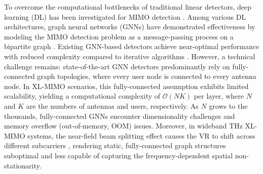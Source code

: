 To overcome the computational bottlenecks of traditional linear detectors, deep learning (DL) has been investigated for MIMO detection \cite{he2020model}. Among various DL architectures, graph neural networks (GNNs) have demonstrated effectiveness by modeling the MIMO detection problem as a message-passing process on a bipartite graph \cite{scotti2020graph, he2023message}. Existing GNN-based detectors achieve near-optimal performance with reduced complexity compared to iterative algorithms \cite{he2023gnn, li2022edge}. However, a technical challenge remains: state-of-the-art GNN detectors predominantly rely on fully-connected graph topologies, where every user node is connected to every antenna node. In XL-MIMO scenarios, this fully-connected assumption exhibits limited scalability, yielding a computational complexity of $\mathcal{O}(NK)$ per layer, where $N$ and $K$ are the numbers of antennas and users, respectively. As $N$ grows to the thousands, fully-connected GNNs encounter dimensionality challenges and memory overflow (out-of-memory, OOM) issues. Moreover, in wideband THz XL-MIMO systems, the near-field beam splitting effect causes the VR to shift across different subcarriers \cite{cui2022near, gao2024deep}, rendering static, fully-connected graph structures suboptimal and less capable of capturing the frequency-dependent spatial non-stationarity.

